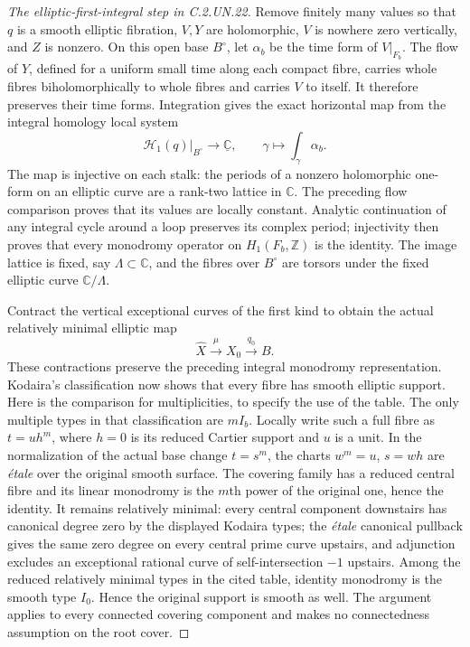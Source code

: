 \begin{proof}[The elliptic-first-integral step in C.2.UN.22]
Remove finitely many values so that $q$ is a smooth
elliptic fibration, $V,Y$ are holomorphic, $V$ is nowhere
zero vertically, and $Z$ is nonzero.  On this open base
$B^\circ$, let $\alpha_b$ be the time form of $V|_{F_b}$.
The flow of $Y$, defined for a uniform small time along
each compact fibre, carries whole fibres biholomorphically
to whole fibres and carries $V$ to itself.  It therefore
preserves their time forms.  Integration gives the exact
horizontal map from the integral homology local system
\[
 \mathcal H_1(q)\big|_{B^\circ}
   \longrightarrow\underline{\mathbb C},
 \qquad
 \gamma\longmapsto\int_\gamma\alpha_b.
 \tag{C.RF.2}
\]
The map is injective on each stalk: the periods of a
nonzero holomorphic one-form on an elliptic curve are a
rank-two lattice in $\mathbb C$.  The preceding flow
comparison proves that its values are locally constant.
Analytic continuation of any integral cycle around a
loop preserves its complex period; injectivity then
proves that every monodromy operator on $H_1(F_b,\mathbb Z)$
is the identity.  The image lattice is fixed, say
$\Lambda\subset\mathbb C$, and the fibres over
$B^\circ$ are torsors under the fixed elliptic curve
$\mathbb C/\Lambda$.

Contract the vertical exceptional curves of the first
kind to obtain the actual relatively minimal elliptic
map
\[
 \widehat X\xrightarrow{\ \mu\ }X_0
       \xrightarrow{\ q_0\ }B.
 \tag{C.RF.3}
\]
These contractions preserve the preceding integral
monodromy representation.  Kodaira's classification
\cite[Theorem~6.2, pp.~564--566, and Table~I, p.~604]{Kodaira1963II}
now shows that every fibre has smooth elliptic support.
Here is the comparison for multiplicities, to specify
the use of the table.  The only multiple types in that
classification are $mI_b$.  Locally write such a full
fibre as $t=u h^m$, where $h=0$ is its reduced Cartier
support and $u$ is a unit.  In the normalization of the
actual base change $t=s^m$, the charts
$w^m=u$, $s=wh$ are \emph{\'etale} over the original
smooth surface.  The covering family has a reduced
central fibre and its linear monodromy is the $m$th
power of the original one, hence the identity.  It
remains relatively minimal: every central component
downstairs has canonical degree zero by the displayed
Kodaira types; the \emph{\'etale} canonical pullback
gives the same zero degree on every central prime
curve upstairs, and adjunction excludes an exceptional
rational curve of self-intersection $-1$ upstairs.
Among the reduced relatively minimal types in the
cited table, identity monodromy is the smooth type
$I_0$.  Hence the original support is smooth as well.
The argument applies to every connected covering
component and makes no connectedness assumption on
the root cover.


\end{proof}
